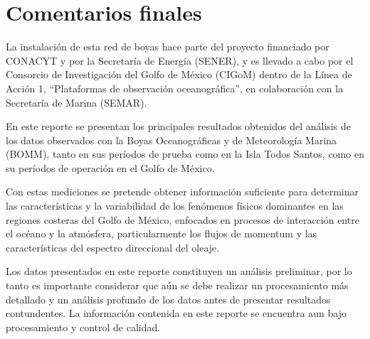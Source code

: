 \documentclass[11pt]{article}
\begin{document}


\clearpage
\section{Comentarios finales}
\label{sec:comentarios_finales}

La instalación de esta red de boyas hace parte del proyecto
financiado por CONACYT y por la Secretaría de Energía (SENER), y es llevado a
cabo por el Consorcio de Investigación del Golfo de México (CIGoM) dentro de la
Línea de Acción 1, ``Plataformas de observación oceanográfica'', en
colaboración con la Secretaría de Marina (SEMAR).

En este reporte se presentan los principales resultados obtenidos del análisis
de los datos observados con la Boyas Oceanográficas y de Meteorología Marina
(BOMM), tanto en sus períodos de prueba como en la Isla Todos Santos, como en su
períodos de operación en el Golfo de México.

Con estas mediciones se pretende obtener información suficiente para determinar
las características y la variabilidad de los fenómenos físicos dominantes en las
regiones costeras del Golfo de México, enfocados en procesos de interacción
entre el océano y la atmósfera, particularmente los flujos de momentum y las
características del espectro direccional del oleaje.

Los datos presentados en este reporte constituyen un análisis preliminar, por lo
tanto es importante considerar que aún se debe realizar un procesamiento más
detallado y un análisis profundo de los datos antes de presentar resultados
contundentes. La información contenida en este reporte se encuentra aun bajo
procesamiento y control de calidad.


\clearpage

\nocite{*}

\end{document}
